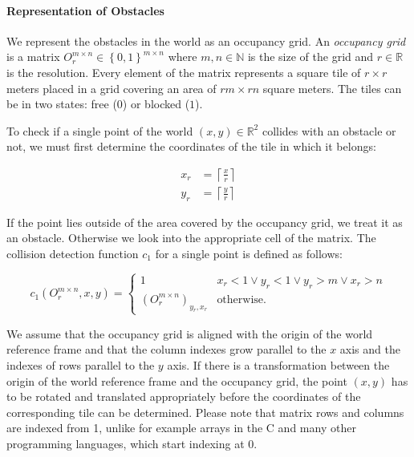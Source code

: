\paragraph{Representation of Obstacles}
We represent the obstacles in the world as an occupancy grid. An \textit{occupancy grid} is a matrix $O_r^{m\times n}\in \left\{0, 1\right\}^{m\times n}$ where $m,n\in\mathbb{N}$ is the size of the grid and $r\in\mathbb{R}$ is the resolution. Every element of the matrix represents a square tile of $r\times r$ meters placed in a grid covering an area of $rm\times rn$ square meters. The tiles can be in two states: free ($0$) or blocked ($1$).

To check if a single point of the world $\left(x,y\right)\in \mathbb{R}^2$ collides with an obstacle or not, we must first determine the coordinates of the tile in which it belongs:

\begin{equation*}
\begin{aligned}
x_r &= \left\lceil \frac{x}{r} \right\rceil \\
y_r &= \left\lceil \frac{y}{r} \right\rceil
\end{aligned}
\end{equation*}

If the point lies outside of the area covered by the occupancy grid, we treat it as an obstacle. Otherwise we look into the appropriate cell of the matrix. The collision detection function $c_1$ for a single point is defined as follows:

\begin{equation*}
c_1(O_{r}^{m\times n}, x, y) =
\begin{cases}
1 & x_r < 1 \lor y_r < 1 \lor y_r > m \lor x_r > n \\
\left(O_{r}^{m\times n}\right)_{y_r, x_r} & \text{otherwise}.
\end{cases}
\end{equation*}

We assume that the occupancy grid is aligned with the origin of the world reference frame and that the column indexes grow parallel to the $x$ axis and the indexes of rows parallel to the $y$ axis. If there is a transformation between the origin of the world reference frame and the occupancy grid, the point $(x, y)$ has to be rotated and translated appropriately before the coordinates of the corresponding tile can be determined. Please note that matrix rows and columns are indexed from 1, unlike for example arrays in the C and many other programming languages, which start indexing at 0.

